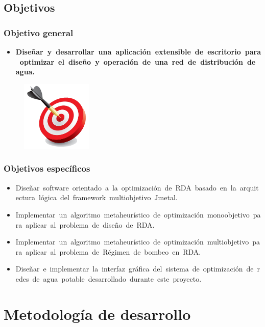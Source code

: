 \documentclass[9pt]{beamer}
\begin{document}
    \subsection{Objetivos}
    \begin{frame}
        \frametitle{Objetivo general}
        
        \begin{itemize}
        \justifying
            \item \textbf{Diseñar y desarrollar una aplicación extensible de escritorio para optimizar el diseño y operación de una red de distribución de agua.}
        \end{itemize}

        \begin{figure}
            \includegraphics[width=0.3\textwidth]{assets/Relleno/objetivo.png}
        \end{figure}

    \end{frame}

    \begin{frame}
        \frametitle{Objetivos específicos}
        \begin{itemize}
            \justifying
            \item Diseñar software orientado a la optimización de RDA basado en la arquitectura lógica del framework multiobjetivo Jmetal.
            \item Implementar un algoritmo metaheurístico de optimización monoobjetivo para aplicar al problema de diseño de RDA.
            \item Implementar un algoritmo metaheurístico de optimización multiobjetivo para aplicar al problema de Régimen de bombeo en RDA.
            \item Diseñar e implementar la interfaz gráfica del sistema de optimización de redes de agua potable desarrollado durante este proyecto.
        \end{itemize}
    \end{frame}

    \section{Metodología de desarrollo}
\end{document}
